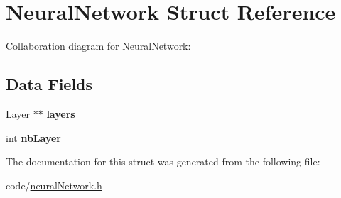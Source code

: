\hypertarget{structNeuralNetwork}{}\section{Neural\+Network Struct Reference}
\label{structNeuralNetwork}


Collaboration diagram for Neural\+Network\+:
\subsection*{Data Fields}
\begin{DoxyCompactItemize}
\item 
\hyperlink{structLayer}{Layer} $\ast$$\ast$ {\bfseries layers}\hypertarget{structNeuralNetwork_ab51772044060b74af39811fff8370991}{}\label{structNeuralNetwork_ab51772044060b74af39811fff8370991}

\item 
int {\bfseries nb\+Layer}\hypertarget{structNeuralNetwork_a34f7b9c763e0508ecc8d1671f4ea100d}{}\label{structNeuralNetwork_a34f7b9c763e0508ecc8d1671f4ea100d}

\end{DoxyCompactItemize}


The documentation for this struct was generated from the following file\+:\begin{DoxyCompactItemize}
\item 
code/\hyperlink{neuralNetwork_8h}{neural\+Network.\+h}\end{DoxyCompactItemize}
